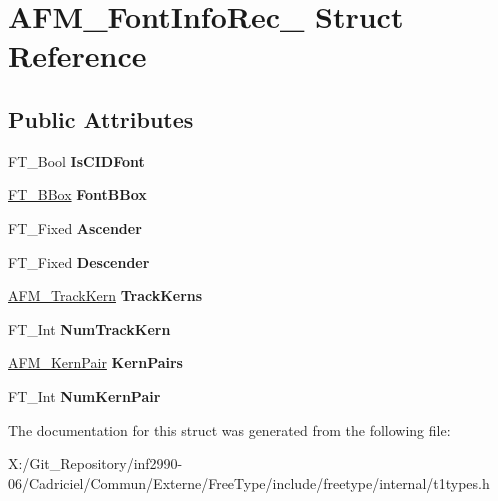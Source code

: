 \hypertarget{struct_a_f_m___font_info_rec__}{\section{A\-F\-M\-\_\-\-Font\-Info\-Rec\-\_\- Struct Reference}
\label{struct_a_f_m___font_info_rec__}
}
\subsection*{Public Attributes}
\begin{DoxyCompactItemize}
\item 
\hypertarget{struct_a_f_m___font_info_rec___a6f198e74da5d8a3b7ff7518e255be231}{F\-T\-\_\-\-Bool {\bfseries Is\-C\-I\-D\-Font}}\label{struct_a_f_m___font_info_rec___a6f198e74da5d8a3b7ff7518e255be231}

\item 
\hypertarget{struct_a_f_m___font_info_rec___afa5112d6b0cc51839889206012dc1be6}{\hyperlink{struct_f_t___b_box__}{F\-T\-\_\-\-B\-Box} {\bfseries Font\-B\-Box}}\label{struct_a_f_m___font_info_rec___afa5112d6b0cc51839889206012dc1be6}

\item 
\hypertarget{struct_a_f_m___font_info_rec___a0b80412562435a2198a71aa4188ee85b}{F\-T\-\_\-\-Fixed {\bfseries Ascender}}\label{struct_a_f_m___font_info_rec___a0b80412562435a2198a71aa4188ee85b}

\item 
\hypertarget{struct_a_f_m___font_info_rec___a3561507200f0bc3413988af920924053}{F\-T\-\_\-\-Fixed {\bfseries Descender}}\label{struct_a_f_m___font_info_rec___a3561507200f0bc3413988af920924053}

\item 
\hypertarget{struct_a_f_m___font_info_rec___a8d9305229a1dacc15b8fceb5dbf25b9d}{\hyperlink{struct_a_f_m___track_kern_rec__}{A\-F\-M\-\_\-\-Track\-Kern} {\bfseries Track\-Kerns}}\label{struct_a_f_m___font_info_rec___a8d9305229a1dacc15b8fceb5dbf25b9d}

\item 
\hypertarget{struct_a_f_m___font_info_rec___a08a9207e8d4b0dd9dc0313218462f00e}{F\-T\-\_\-\-Int {\bfseries Num\-Track\-Kern}}\label{struct_a_f_m___font_info_rec___a08a9207e8d4b0dd9dc0313218462f00e}

\item 
\hypertarget{struct_a_f_m___font_info_rec___a16c5da5249d4d4f68cc169469f3ee75a}{\hyperlink{struct_a_f_m___kern_pair_rec__}{A\-F\-M\-\_\-\-Kern\-Pair} {\bfseries Kern\-Pairs}}\label{struct_a_f_m___font_info_rec___a16c5da5249d4d4f68cc169469f3ee75a}

\item 
\hypertarget{struct_a_f_m___font_info_rec___a8ff8af3c83fbf0b060bb711b57f1affd}{F\-T\-\_\-\-Int {\bfseries Num\-Kern\-Pair}}\label{struct_a_f_m___font_info_rec___a8ff8af3c83fbf0b060bb711b57f1affd}

\end{DoxyCompactItemize}


The documentation for this struct was generated from the following file\-:\begin{DoxyCompactItemize}
\item 
X\-:/\-Git\-\_\-\-Repository/inf2990-\/06/\-Cadriciel/\-Commun/\-Externe/\-Free\-Type/include/freetype/internal/t1types.\-h\end{DoxyCompactItemize}
